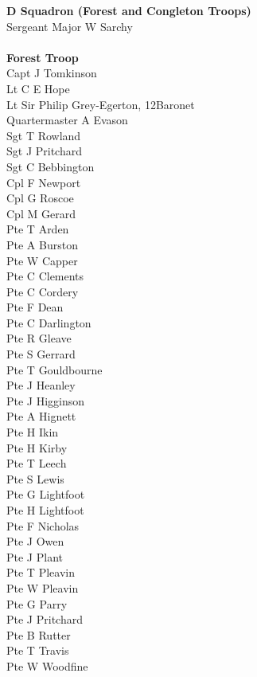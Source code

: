 \begin{multicols}{2}
  \textbf{D Squadron (Forest and Congleton Troops)} \\
  Sergeant Major W Sarchy \\
  \\
  \textbf{Forest Troop} \\
  Capt J Tomkinson \\
  Lt C E Hope \\
  Lt Sir Philip Grey-Egerton, 12\nth Baronet \\
  Quartermaster A Evason \\
  Sgt T Rowland \\
  Sgt J Pritchard \\
  Sgt C Bebbington \\
  Cpl F Newport \\
  Cpl G Roscoe \\
  Cpl M Gerard \\
  Pte T Arden \\
  Pte A Burston \\
  Pte W Capper \\
  Pte C Clements \\
  Pte C Cordery \\
  Pte F Dean \\
  Pte C Darlington \\
  Pte R Gleave \\
  Pte S Gerrard \\
  Pte T Gouldbourne \\
  Pte J Heanley \\
  Pte J Higginson \\
  Pte A Hignett \\
  Pte H Ikin \\
  Pte H Kirby \\
  Pte T Leech \\
  Pte S Lewis \\
  Pte G Lightfoot \\
  Pte H Lightfoot \\
  Pte F Nicholas \\
  Pte J Owen \\
  Pte J Plant \\
  Pte T Pleavin \\
  Pte W Pleavin \\
  Pte G Parry \\
  Pte J Pritchard \\
  Pte B Rutter \\
  Pte T Travis \\
  Pte W Woodfine \\

\end{multicols}
